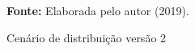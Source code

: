 \begin{figure}[ht!]
\centering

\caption{\textmd{Cenário de distribuição versão 2}}
\label{fig:cenario2}

\par\medskip\textbf{Fonte:} Elaborada pelo autor (2019). \par\medskip
\end{figure}

